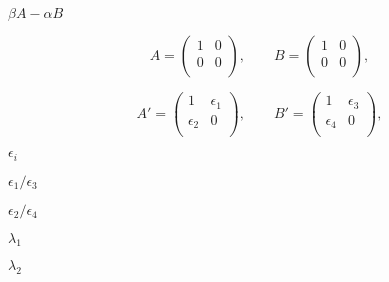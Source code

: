 {\newpage\clearpage
{}%
$\beta A  - \alpha B$%
\lthtmlinlinemathZ
\lthtmlcheckvsize\clearpage}

{\newpage\clearpage
{}%
\begin{displaymath}
A  = \left( \begin{array}{cc}
                          1 & 0 \\0 & 0 \\
            \end{array} \right), \quad\quad
B  = \left( \begin{array}{cc}
                         1 & 0 \\0 & 0 \\
            \end{array} \right),
\end{displaymath}%
\lthtmldisplayZ
\lthtmlcheckvsize\clearpage}

{\newpage\clearpage
{}%
\begin{displaymath}
A'  = \left( \begin{array}{cc}
                          1 & \epsilon_1 \\\epsilon_2 & 0 \\
            \end{array} \right), \quad\quad
B'  = \left( \begin{array}{cc}
                         1 & \epsilon_3 \\\epsilon_4 & 0 \\
            \end{array} \right),
\end{displaymath}%
\lthtmldisplayZ
\lthtmlcheckvsize\clearpage}

{\newpage\clearpage
{}%
$\epsilon_i$%
\lthtmlinlinemathZ
\lthtmlcheckvsize\clearpage}

{\newpage\clearpage
{}%
$\epsilon_1 / \epsilon_3$%
\lthtmlinlinemathZ
\lthtmlcheckvsize\clearpage}

{\newpage\clearpage
{}%
$\epsilon_2 / \epsilon_4$%
\lthtmlinlinemathZ
\lthtmlcheckvsize\clearpage}

{\newpage\clearpage
{}%
$\lambda_1$%
\lthtmlinlinemathZ
\lthtmlcheckvsize\clearpage}

{\newpage\clearpage
{}%
$\lambda_2$%
\lthtmlinlinemathZ
\lthtmlcheckvsize\clearpage}

